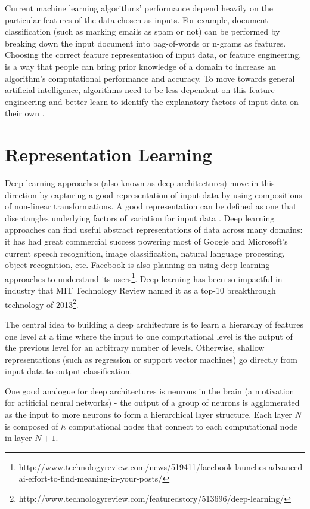 Current machine learning algorithms' performance depend heavily on the particular features of the data chosen as inputs. For example, document classification (such as marking emails as spam or not) can be performed by breaking down the input document into bag-of-words or n-grams as features. Choosing the correct feature representation of input data, or feature engineering, is a way that people can bring prior knowledge of a domain to increase an algorithm's computational performance and accuracy. To move towards general artificial intelligence, algorithms need to be less dependent on this feature engineering and better learn to identify the explanatory factors of input data on their own \cite{bengio12}.

\section{Representation Learning}
Deep learning approaches (also known as deep architectures) move in this direction by capturing a good representation of input data by using compositions of non-linear transformations. A good representation can be defined as one that disentangles underlying factors of variation for input data \cite{bengio13}. Deep learning approaches can find useful abstract representations of data across many domains: it has had great commercial success powering most of Google and Microsoft's current speech recognition, image classification, natural language processing, object recognition, etc. Facebook is also planning on using deep learning approaches to understand its users\footnote{http://www.technologyreview.com/news/519411/facebook-launches-advanced-ai-effort-to-find-meaning-in-your-posts/}. Deep learning has been so impactful in industry that MIT Technology Review named it as a top-10 breakthrough technology of 2013\footnote{http://www.technologyreview.com/featuredstory/513696/deep-learning/}.

The central idea to building a deep architecture is to learn a hierarchy of features one level at a time where the input to one computational level is the output of the previous level for an arbitrary number of levels. Otherwise, shallow representations (such as regression or support vector machines) go directly from input data to output classification.

One good analogue for deep architectures is neurons in the brain (a motivation for artificial neural networks) - the output of a group of neurons is agglomerated as the input to more neurons to form a hierarchical layer structure. Each layer \(N\) is composed of \(h\) computational nodes that connect to each computational node in layer \(N+1\).

